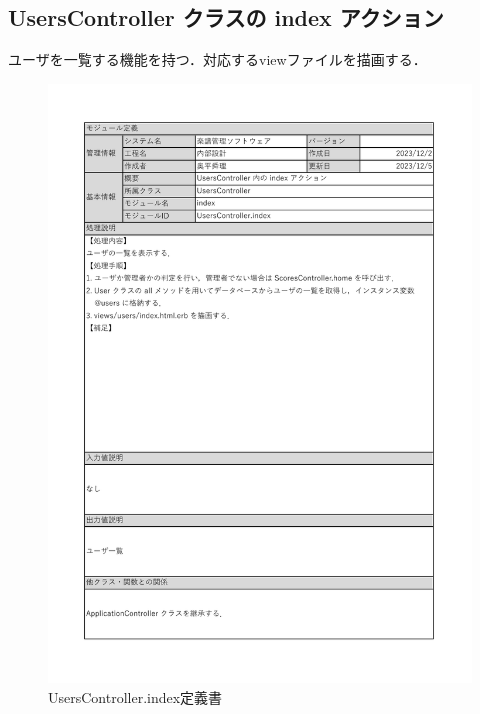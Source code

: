 \subsection*{UsersController クラスの index アクション}
ユーザを一覧する機能を持つ．対応するviewファイルを描画する．
\begin{figure}[H]
    \centering
    \includegraphics[scale=0.6]{img/Users/xlsx/UsersController_index.pdf}
    \vspace{-1cm}
    \caption{UsersController.index定義書}
\end{figure}
